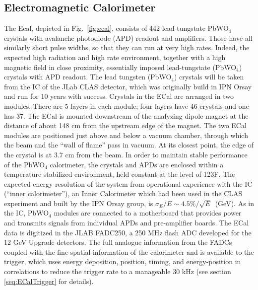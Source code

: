 \subsection{Electromagnetic Calorimeter} 
\label{sec:ecal}

The Ecal, depicted in Fig. \ref{fig:ecal}, consists of 442 lead-tungstate PbWO$_4$ crystals with avalanche photodiode (APD) readout and amplifiers. Those have all similarly short pulse widths, so that they can run at very high rates. Indeed, the expected high radiation and high rate environment, together with a high magnetic field in close proximity, essentially imposed lead-tungstate (PbWO$_4$) crystals with APD readout. The lead tungsten (PbWO$_4$) crystals will be taken from the IC of the JLab CLAS detector, which was originally build in IPN Orsay and run for 10 years with success. Crystals in the ECal are arranged in two modules. There are 5 layers in each module; four layers have 46 crystals and one has 37. The ECal is mounted downstream of the analyzing dipole magnet at the distance of about 148 cm from the upstream edge of the magnet. The two ECal modules are positioned just above and below a vacuum chamber, through which the beam and the “wall of flame” pass in vacuum. At its closest point, the edge of the crystal is at 3.7 cm from the beam. In order to maintain stable performance of the PbWO$_4$ calorimeter, the crystals and APDs are enclosed within a temperature stabilized environment, held constant at the level of 1\!\char23F. The expected energy resolution of the system from operational experience with the IC (“inner calorimeter”), an Inner Calorimeter which had been used in the CLAS experiment and built by the IPN Orsay group, is $\sigma_E/E \sim 4.5\%/\sqrt{E}$ (GeV). As in the IC, PbWO$_4$ modules are connected to a motherboard that provides power and transmits signals from individual APDs and pre-amplifier boards. The ECal data is digitized in the JLAB FADC250, a 250 MHz flash ADC developed for the 12 GeV Upgrade detectors. The full analogue information from the FADCs coupled with the fine spatial information of the calorimeter and is available to the trigger, which uses energy deposition, position, timing, and energy-position in correlations to reduce the trigger rate to a manageable 30 kHz (see section \ref{seq:ECalTrigger} for details).


